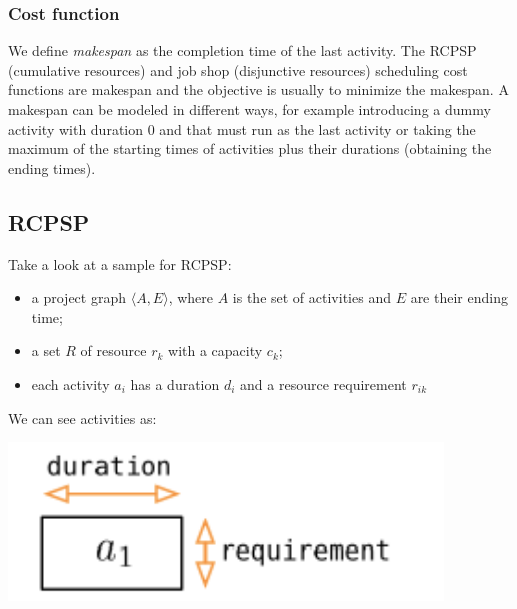 \documentclass[10pt,a4paper]{article}
\begin{document}
\subsubsection{Cost function}
We define \textit{makespan} as the completion time of the last activity.
The RCPSP (cumulative resources) and job shop (disjunctive resources) scheduling
cost functions are makespan and the objective is usually to minimize the
makespan. A makespan can be modeled in different ways, for example introducing
a dummy activity with duration 0 and that must run as the last activity or
taking the maximum of the starting times of activities plus their durations
(obtaining the ending times).

\subsection{RCPSP}
Take a look at a sample for RCPSP:
\begin{itemize}
    \item a project graph $\langle A, E \rangle$, where $A$ is the set of
    activities and $E$ are their ending time;
    \item a set $R$ of resource $r_k$ with a capacity $c_k$;
    \item each activity $a_i$ has a duration $d_i$ and a resource requirement
    $r_{ik}$
\end{itemize}
We can see activities as:

\includegraphics[scale=0.35]{activity.png}
\end{document}

